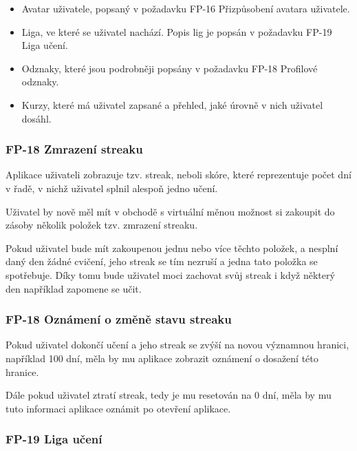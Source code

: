 \begin{itemize}
    \item Avatar uživatele, popsaný v požadavku FP-16 Přizpůsobení avatara uživatele. %
    \item Liga, ve které se uživatel nachází. Popis lig je popsán v požadavku FP-19 Liga učení. %
    \item Odznaky, které jsou podrobněji popsány v požadavku FP-18 Profilové odznaky. %
    \item Kurzy, které má uživatel zapsané a přehled, jaké úrovně v nich uživatel dosáhl.
\end{itemize}

\subsubsection{FP-18 Zmrazení streaku}

Aplikace uživateli zobrazuje tzv. streak, neboli skóre, které reprezentuje počet dní v řadě, v nichž uživatel splnil alespoň jedno učení.

Uživatel by nově měl mít v obchodě s virtuální měnou možnost si zakoupit do zásoby několik položek tzv. zmrazení streaku.

Pokud uživatel bude mít zakoupenou jednu nebo více těchto položek, a nesplní daný den žádné cvičení, jeho streak se tím nezruší a jedna tato položka se spotřebuje. Díky tomu bude uživatel moci zachovat svůj streak i když některý den například zapomene se učit.

\subsubsection{FP-18 Oznámení o změně stavu streaku}

Pokud uživatel dokončí učení a jeho streak se zvýší na novou významnou hranici, například 100 dní, měla by mu aplikace zobrazit oznámení o dosažení této hranice.

Dále pokud uživatel ztratí streak, tedy je mu resetován na 0 dní, měla by mu tuto informaci aplikace oznámit po otevření aplikace. %

\subsubsection{FP-19 Liga učení}

